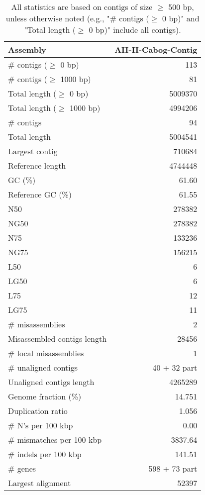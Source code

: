 \documentclass[12pt,a4paper]{article}
\begin{document}
\begin{table}[ht]
\begin{center}
\caption{All statistics are based on contigs of size $\geq$ 500 bp, unless otherwise noted (e.g., "\# contigs ($\geq$ 0 bp)" and "Total length ($\geq$ 0 bp)" include all contigs).}
\begin{tabular}{|l*{1}{|r}|}
\hline
Assembly & AH-H-Cabog-Contig \\ \hline
\# contigs ($\geq$ 0 bp) & 113 \\ \hline
\# contigs ($\geq$ 1000 bp) & 81 \\ \hline
Total length ($\geq$ 0 bp) & 5009370 \\ \hline
Total length ($\geq$ 1000 bp) & 4994206 \\ \hline
\# contigs & 94 \\ \hline
Total length & 5004541 \\ \hline
Largest contig & 710684 \\ \hline
Reference length & 4744448 \\ \hline
GC (\%) & 61.60 \\ \hline
Reference GC (\%) & 61.55 \\ \hline
N50 & 278382 \\ \hline
NG50 & 278382 \\ \hline
N75 & 133236 \\ \hline
NG75 & 156215 \\ \hline
L50 & 6 \\ \hline
LG50 & 6 \\ \hline
L75 & 12 \\ \hline
LG75 & 11 \\ \hline
\# misassemblies & 2 \\ \hline
Misassembled contigs length & 28456 \\ \hline
\# local misassemblies & 1 \\ \hline
\# unaligned contigs & 40 + 32 part \\ \hline
Unaligned contigs length & 4265289 \\ \hline
Genome fraction (\%) & 14.751 \\ \hline
Duplication ratio & 1.056 \\ \hline
\# N's per 100 kbp & 0.00 \\ \hline
\# mismatches per 100 kbp & 3837.64 \\ \hline
\# indels per 100 kbp & 141.51 \\ \hline
\# genes & 598 + 73 part \\ \hline
Largest alignment & 52397 \\ \hline
\end{tabular}
\end{center}
\end{table}
\end{document}
